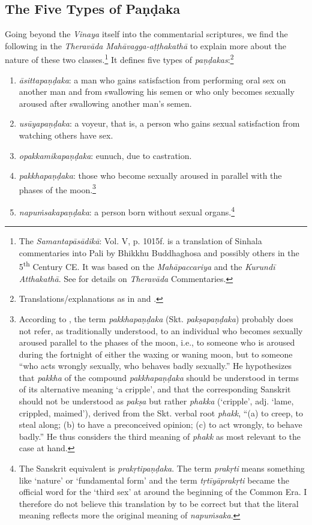 \subsection{The Five Types of Paṇḍaka}
Going beyond the {\em Vinaya} itself into the commentarial scriptures, we find the following in the {\em Theravāda} {\em Mahāvagga-aṭṭhakathā} to explain more about the nature of these two classes.\footnote{The {\em Samantapāsādikā}: Vol. V, p. 1015f. is a translation of Sinhala commentaries into Pali by Bhikkhu Buddhaghosa and possibly others in the 5\textsuperscript{th} Century CE. It was based on the {\em Mahāpaccariya} and the {\em Kurundī Atthakathā}. See \cite{goonesekere} for details on {\em Theravāda} Commentaries.} It defines five types of {\em paṇḍakas}:\footnote{Translations/explanations as in \cite{bomhard} and \cite{thanissaro}.}

\begin{enumerate}
\item {\em āsittapaṇḍaka}: a man who gains satisfaction from performing oral sex on another man and from swallowing his semen or who only becomes sexually aroused after swallowing another man’s semen. 
\item {\em usūyapaṇḍaka}: a voyeur, that is, a person who gains sexual satisfaction from watching others have sex. 
\item {\em opakkamikapaṇḍaka}: eunuch, due to castration.
\item {\em pakkhapaṇḍaka}: those who become sexually aroused in parallel with the phases of the moon.\footnote{According to \cite{bomhard}, the term {\em pakkhapaṇḍaka} (Skt. {\em pakṣapaṇḍaka}) probably does not refer, as traditionally understood, to an individual who becomes sexually aroused parallel to the phases of the moon, i.e., to someone who is aroused during the fortnight of either the waxing or waning moon, but to someone ``who acts wrongly sexually, who behaves badly sexually.'' He hypothesizes that {\em pakkha} of the compound {\em pakkhapaṇḍaka} should be understood in terms of its alternative meaning `a cripple', and that the corresponding Sanskrit should not be understood as {\em pakṣa} but rather {\em phakka} (`cripple', adj. `lame, crippled, maimed'), derived from the Skt. verbal root {\em phakk}, ``(a) to creep, to steal along; (b) to have a preconceived opinion; (c) to act wrongly, to behave badly.'' He thus considers the third meaning of {\em phakk} as most relevant to the case at hand.}
\item {\em napuṁsakapaṇḍaka}: a person born without sexual organs.\footnote{The Sanskrit equivalent is {\em prakṛtipaṇḍaka}. The term {\em prakṛti} means something like `nature' or `fundamental form' and the term {\em tṛtīyāprakṛti} became the official word for the `third sex' at around the beginning of the Common Era. I therefore do not believe this translation by \cite{thanissaro} to be correct but that the literal meaning reflects more the original meaning of {\em napuṁsaka}.} 
\end{enumerate}

